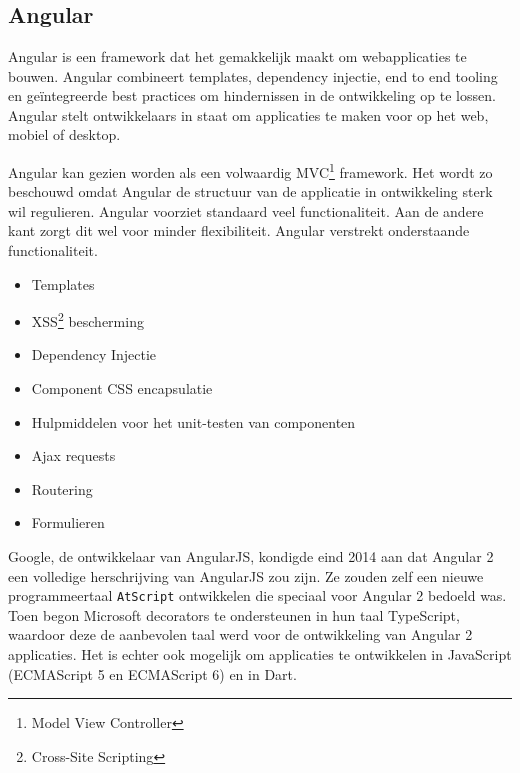 \chapter{}
\label{ch:stand-van-zaken}




\section{Angular}

Angular is een framework dat het gemakkelijk maakt om webapplicaties te bouwen. Angular combineert templates, dependency injectie, end to end tooling en geïntegreerde best practices om hindernissen in de ontwikkeling op te lossen. Angular stelt ontwikkelaars in staat om applicaties te maken voor op het web, mobiel of desktop. \autocite{Lotanna2019}

Angular kan gezien worden als een volwaardig MVC\footnote{Model View Controller} framework. Het wordt zo beschouwd omdat Angular de structuur van de applicatie in ontwikkeling sterk wil regulieren. Angular voorziet standaard veel functionaliteit. Aan de andere kant zorgt dit wel voor minder flexibiliteit. Angular verstrekt onderstaande functionaliteit. \autocite{Hamedani2018}
\begin{itemize}
	\item Templates
	\item XSS\footnote{Cross-Site Scripting} bescherming
	\item Dependency Injectie
	\item Component CSS encapsulatie
	\item Hulpmiddelen voor het unit-testen van componenten
	\item Ajax requests
	\item Routering
	\item Formulieren
\end{itemize}

Google, de ontwikkelaar van AngularJS, kondigde eind 2014 aan dat Angular 2 een volledige herschrijving van AngularJS zou zijn. Ze zouden zelf een nieuwe programmeertaal \texttt{AtScript} ontwikkelen die speciaal voor Angular 2 bedoeld was. Toen begon Microsoft decorators te ondersteunen in hun taal TypeScript, waardoor deze de aanbevolen taal werd voor de ontwikkeling van Angular 2 applicaties. Het is echter ook mogelijk om applicaties te ontwikkelen in JavaScript (ECMAScript 5 en ECMAScript 6) en in Dart. \autocite{Fain2016}

